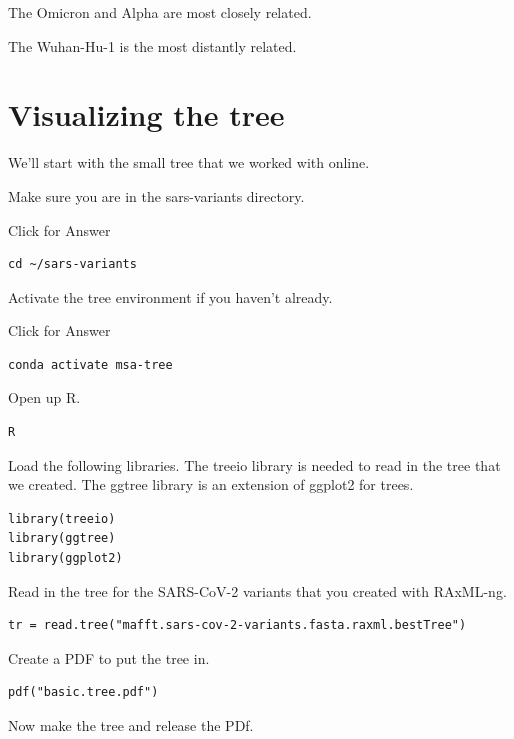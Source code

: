 \documentclass[
]{book}
\begin{document}
The Omicron and Alpha are most closely related.

The Wuhan-Hu-1 is the most distantly related.

\hypertarget{visualizing-the-tree}{%
\section{Visualizing the tree}\label{visualizing-the-tree}}

We'll start with the small tree that we worked with online.

Make sure you are in the sars-variants directory.

Click for Answer

\begin{verbatim}
cd ~/sars-variants
\end{verbatim}

\hfill\break

Activate the tree environment if you haven't already.

Click for Answer

\begin{verbatim}
conda activate msa-tree
\end{verbatim}

\hfill\break

Open up R.

\begin{verbatim}
R
\end{verbatim}

Load the following libraries. The treeio library is needed to read in the tree that we created. The ggtree library is an extension of ggplot2 for trees.

\begin{verbatim}
library(treeio)
library(ggtree)
library(ggplot2)
\end{verbatim}

Read in the tree for the SARS-CoV-2 variants that you created with RAxML-ng.

\begin{verbatim}
tr = read.tree("mafft.sars-cov-2-variants.fasta.raxml.bestTree")
\end{verbatim}

Create a PDF to put the tree in.

\begin{verbatim}
pdf("basic.tree.pdf")
\end{verbatim}

Now make the tree and release the PDf.
\end{document}
